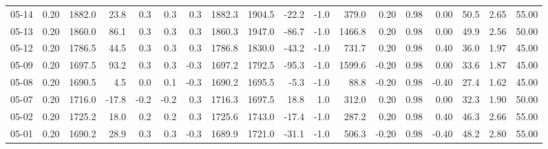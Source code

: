 \begin{threeparttable}
{\begin{tabular}{lrrrrrrrrrrrrrrrrr}
  05-14 &     0.20 & 1882.0 &              23.8 &               0.3 &                0.3 &                0.3 & 1882.3 & 1904.5 &      -22.2 &                     -1.0 &               379.0 &       0.20 &      0.98 &           0.00 &             50.5 &            2.65 &                  55.00 \\
  05-13 &     0.20 & 1860.0 &              86.1 &               0.3 &                0.3 &                0.3 & 1860.3 & 1947.0 &      -86.7 &                     -1.0 &              1466.8 &       0.20 &      0.98 &           0.00 &             49.9 &            2.56 &                  50.00 \\
  05-12 &     0.20 & 1786.5 &              44.5 &               0.3 &                0.3 &                0.3 & 1786.8 & 1830.0 &      -43.2 &                     -1.0 &               731.7 &       0.20 &      0.98 &           0.40 &             36.0 &            1.97 &                  45.00 \\
  05-09 &     0.20 & 1697.5 &              93.2 &               0.3 &                0.3 &               -0.3 & 1697.2 & 1792.5 &      -95.3 &                     -1.0 &              1599.6 &      -0.20 &      0.98 &           0.00 &             33.6 &            1.87 &                  45.00 \\
  05-08 &     0.20 & 1690.5 &               4.5 &               0.0 &                0.1 &               -0.3 & 1690.2 & 1695.5 &       -5.3 &                     -1.0 &                88.8 &      -0.20 &      0.98 &          -0.40 &             27.4 &            1.62 &                  45.00 \\
  05-07 &     0.20 & 1716.0 &             -17.8 &              -0.2 &               -0.2 &                0.3 & 1716.3 & 1697.5 &       18.8 &                      1.0 &               312.0 &       0.20 &      0.98 &           0.00 &             32.3 &            1.90 &                  50.00 \\
  05-02 &     0.20 & 1725.2 &              18.0 &               0.2 &                0.2 &                0.3 & 1725.6 & 1743.0 &      -17.4 &                     -1.0 &               287.2 &       0.20 &      0.98 &           0.40 &             46.3 &            2.66 &                  55.00 \\
  05-01 &     0.20 & 1690.2 &              28.9 &               0.3 &                0.3 &               -0.3 & 1689.9 & 1721.0 &      -31.1 &                     -1.0 &               506.3 &      -0.20 &      0.98 &          -0.40 &             48.2 &            2.80 &                  55.00 \\

\end{tabular}}
\end{threeparttable}
